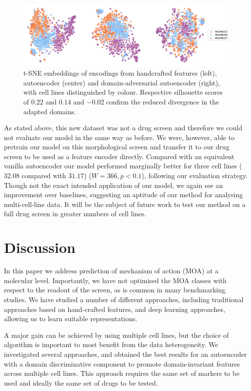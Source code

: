 \begin{figure}[htb]
\centering
  \includegraphics[width=\linewidth]{img/3_cell_lines.pdf}
  \caption{t-SNE embeddings of encodings from handcrafted features (left), autoencoder (center) and domain-adversarial autoencoder (right), with cell lines distinguished by colour. Respective silhouette scores of $0.22$ and $0.14$ and $-0.02$ confirm the reduced divergence in the adapted domains.}
\label{fig:3_cell_lines}
\end{figure}

As stated above, this new dataset was not a drug screen and therefore we could not evaluate our model in the same way as before. We were, however, able to pretrain our model on this morphological screen and transfer it to our drug screen to be used as a feature encoder directly. Compared with an equivalent vanilla autoencoder our model performed marginally better for three cell lines ($32.08$ compared with $31.17$) ($W = 366, p < 0.1$), following our evaluation strategy.
Though not the exact intended application of our model, we again see an improvement over baselines, suggesting an aptitude of our method for analysing multi-cell-line data. It will be the subject of future work to test our method on a full drug screen in greater numbers of cell lines.

\section{Discussion}
\label{sec:discussion}

In this paper we address prediction of mechanism of action (MOA) at a molecular level. Importantly, we have not optimised the MOA classes with respect to the readout of the screen, as is common in many benchmarking studies. We have studied a number of different approaches, including traditional approaches based on hand-crafted features, and deep learning approaches, allowing us to learn suitable representations.

A major gain can be achieved by using multiple cell lines, but the choice of algorithm is important to most benefit from the data heterogeneity. We investigated several approaches, and obtained the best results for an autoencoder with a domain discriminative component to promote domain-invariant features across multiple cell lines. This approach requires the same set of markers to be used and ideally the same set of drugs to be tested.


